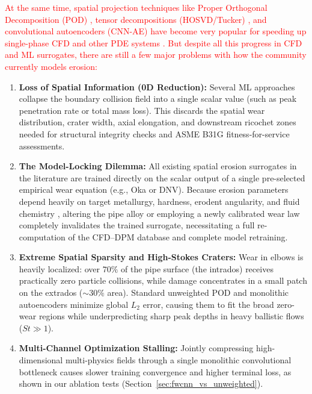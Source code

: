 \documentclass{article}
\begin{document}
\textcolor{red}{At the same time, spatial projection techniques like Proper Orthogonal Decomposition (POD) \cite{sirovich1987turbulence,rozza2008reduced,quarteroni2015reduced}, tensor decompositions (HOSVD/Tucker) \cite{tucker1966some,lathauwer2000multilinear,barragan2025motif,alsayyari2019}, and convolutional autoencoders (CNN-AE) \cite{fresca2021pod,xiao2019,murata2020nonlinear,hajisharifi2023non,jiang2023data,garcia2016data} have become very popular for speeding up single-phase CFD and other PDE systems \cite{brunton2019data}. But despite all this progress in CFD and ML surrogates, there are still a few major problems with how the community currently models erosion:}
\begin{enumerate}
    \item \textbf{Loss of Spatial Information (0D Reduction):} Several ML approaches \cite{zahedi2018,othman2024integration,wang2022numerical,wang2022solid,zhang2021solid} collapse the boundary collision field into a single scalar value (such as peak penetration rate or total mass loss). This discards the spatial wear distribution, crater width, axial elongation, and downstream ricochet zones needed for structural integrity checks and ASME B31G fitness-for-service assessments.
    
    \item \textbf{The Model-Locking Dilemma:} All existing spatial erosion surrogates in the literature \cite{ma2024mechanism,chen2024novel,li2026cfd,pandya2020cfd} are trained directly on the scalar output of a single pre-selected empirical wear equation (e.g., Oka or DNV). Because erosion parameters depend heavily on target metallurgy, hardness, erodent angularity, and fluid chemistry \cite{parsi2014review,kang2024erosive,jindal2026artificial}, altering the pipe alloy or employing a newly calibrated wear law completely invalidates the trained surrogate, necessitating a full re-computation of the CFD--DPM database and complete model retraining.
    
    \item \textbf{Extreme Spatial Sparsity and High-Stokes Craters:} Wear in elbows is heavily localized: over $70\%$ of the pipe surface (the intrados) receives practically zero particle collisions, while damage concentrates in a small patch on the extrados ($\sim 30\%$ area). Standard unweighted POD and monolithic autoencoders minimize global $L_2$ error, causing them to fit the broad zero-wear regions while underpredicting sharp peak depths in heavy ballistic flows ($St \gg 1$).
    
    \item \textbf{Multi-Channel Optimization Stalling:} Jointly compressing high-dimensional multi-physics fields through a single monolithic convolutional bottleneck causes slower training convergence and higher terminal loss, as shown in our ablation tests (Section~\ref{sec:fwcnn_vs_unweighted}).
\end{enumerate}
\end{document}
